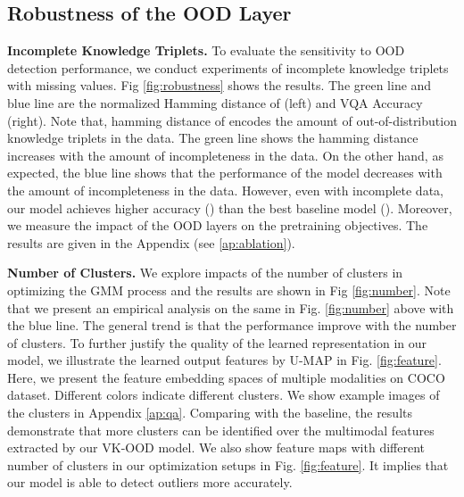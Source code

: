 \documentclass{article}
\begin{document}
\subsection{Robustness of the OOD Layer}
\label{sec:robust_ood}

\textbf{Incomplete Knowledge Triplets.} To evaluate the sensitivity to OOD detection performance, we conduct experiments of incomplete knowledge triplets with missing values. Fig \ref{fig:robustness} shows the results. The green line and blue line are the normalized Hamming distance of  (left) and VQA Accuracy (right). Note that, hamming distance of  encodes the amount of out-of-distribution knowledge triplets in the data. The green line shows the hamming distance increases with the amount of incompleteness in the data. On the other hand, as expected, the blue line shows that the performance of the model decreases with the amount of incompleteness in the data. However, even with  incomplete data, our model achieves higher accuracy () than the best baseline model (). Moreover, we measure the impact of the OOD layers on the pretraining objectives. The results are given in the Appendix (see \ref{ap:ablation}).

\textbf{Number of Clusters. } We explore impacts of the number of clusters in optimizing the GMM process and the results are shown in Fig \ref{fig:number}. Note that we present an empirical analysis on the same in Fig. \ref{fig:number} above with the blue line. The general trend is that the performance improve with the number of clusters. To further justify the quality of the learned representation in our model, we illustrate the learned output features by U-MAP \cite{mcinnes2018umap-software} in Fig. \ref{fig:feature}.  Here, we present the feature embedding spaces of multiple modalities on COCO dataset. Different colors indicate different clusters. We show example images of the clusters in Appendix \ref{ap:qa}. Comparing with the baseline, the results demonstrate that more clusters can be identified over the multimodal features extracted by our VK-OOD model. We also show feature maps with different number of clusters in our optimization setups in Fig. \ref{fig:feature}. It implies that our model is able to detect outliers more accurately.
\end{document}
